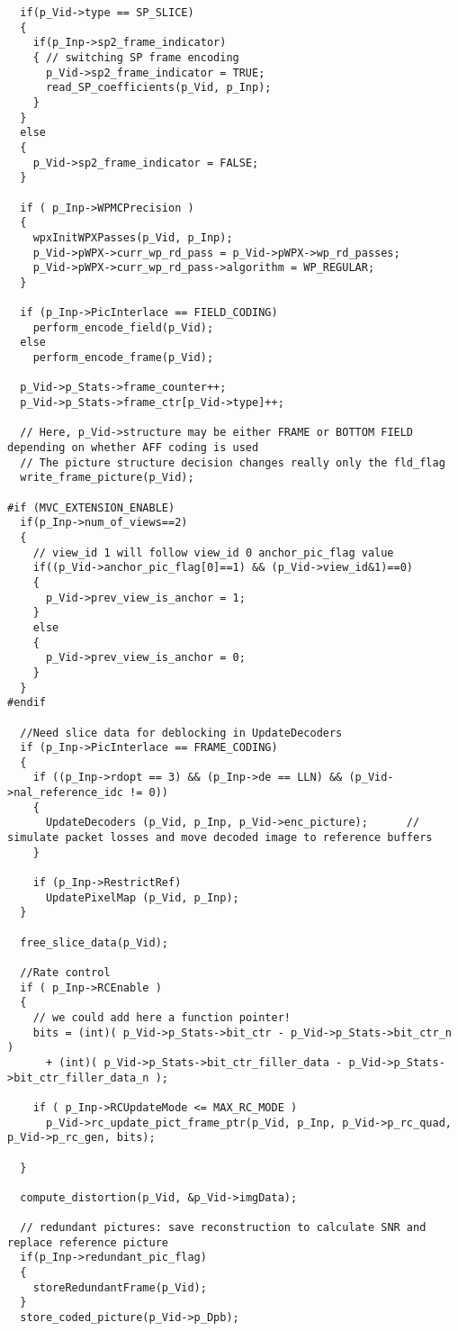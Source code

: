 \begin{lstlisting}
  if(p_Vid->type == SP_SLICE)
  {
    if(p_Inp->sp2_frame_indicator)
    { // switching SP frame encoding
      p_Vid->sp2_frame_indicator = TRUE;
      read_SP_coefficients(p_Vid, p_Inp);
    }
  }
  else
  {
    p_Vid->sp2_frame_indicator = FALSE;
  }

  if ( p_Inp->WPMCPrecision )
  {
    wpxInitWPXPasses(p_Vid, p_Inp);
    p_Vid->pWPX->curr_wp_rd_pass = p_Vid->pWPX->wp_rd_passes;
    p_Vid->pWPX->curr_wp_rd_pass->algorithm = WP_REGULAR;
  }

  if (p_Inp->PicInterlace == FIELD_CODING)
    perform_encode_field(p_Vid);
  else
    perform_encode_frame(p_Vid);

  p_Vid->p_Stats->frame_counter++;
  p_Vid->p_Stats->frame_ctr[p_Vid->type]++;

  // Here, p_Vid->structure may be either FRAME or BOTTOM FIELD depending on whether AFF coding is used
  // The picture structure decision changes really only the fld_flag
  write_frame_picture(p_Vid);

#if (MVC_EXTENSION_ENABLE)
  if(p_Inp->num_of_views==2)
  {
    // view_id 1 will follow view_id 0 anchor_pic_flag value
    if((p_Vid->anchor_pic_flag[0]==1) && (p_Vid->view_id&1)==0)
    {
      p_Vid->prev_view_is_anchor = 1;
    }
    else
    {
      p_Vid->prev_view_is_anchor = 0;
    }
  }
#endif

  //Need slice data for deblocking in UpdateDecoders
  if (p_Inp->PicInterlace == FRAME_CODING)
  {
    if ((p_Inp->rdopt == 3) && (p_Inp->de == LLN) && (p_Vid->nal_reference_idc != 0))
    {
      UpdateDecoders (p_Vid, p_Inp, p_Vid->enc_picture);      // simulate packet losses and move decoded image to reference buffers
    }

    if (p_Inp->RestrictRef)
      UpdatePixelMap (p_Vid, p_Inp);
  }

  free_slice_data(p_Vid);

  //Rate control
  if ( p_Inp->RCEnable )
  {
    // we could add here a function pointer!
    bits = (int)( p_Vid->p_Stats->bit_ctr - p_Vid->p_Stats->bit_ctr_n )
      + (int)( p_Vid->p_Stats->bit_ctr_filler_data - p_Vid->p_Stats->bit_ctr_filler_data_n );

    if ( p_Inp->RCUpdateMode <= MAX_RC_MODE )
      p_Vid->rc_update_pict_frame_ptr(p_Vid, p_Inp, p_Vid->p_rc_quad, p_Vid->p_rc_gen, bits);

  }

  compute_distortion(p_Vid, &p_Vid->imgData);

  // redundant pictures: save reconstruction to calculate SNR and replace reference picture
  if(p_Inp->redundant_pic_flag)
  {
    storeRedundantFrame(p_Vid);
  }
  store_coded_picture(p_Vid->p_Dpb);


\end{lstlisting}
